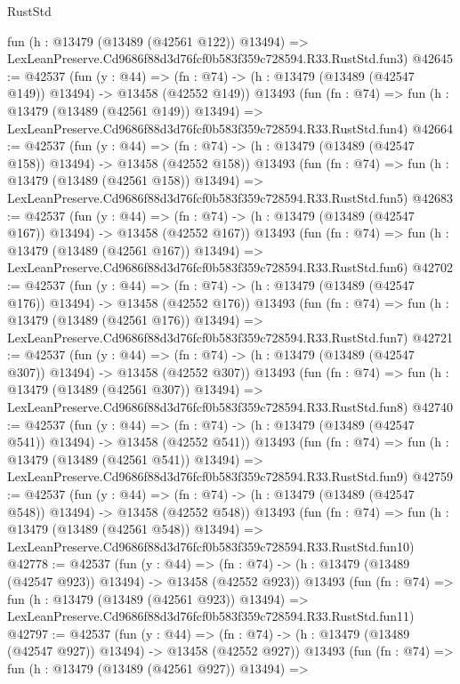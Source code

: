 \begin{lexlean}{RustStd}
\begin{coremodule}
    fun (h : @13479 (@13489 (@42561 @122)) @13494) =>
    LexLeanPreserve.Cd9686f88d3d76fcf0b583f359c728594.R33.RustStd.fun3)
@42645 := @42537
    (fun (y : @44) =>
    (fn : @74) -> (h : @13479 (@13489 (@42547 @149)) @13494) -> @13458 (@42552 @149))
    @13493
    (fun (fn : @74) =>
    fun (h : @13479 (@13489 (@42561 @149)) @13494) =>
    LexLeanPreserve.Cd9686f88d3d76fcf0b583f359c728594.R33.RustStd.fun4)
@42664 := @42537
    (fun (y : @44) =>
    (fn : @74) -> (h : @13479 (@13489 (@42547 @158)) @13494) -> @13458 (@42552 @158))
    @13493
    (fun (fn : @74) =>
    fun (h : @13479 (@13489 (@42561 @158)) @13494) =>
    LexLeanPreserve.Cd9686f88d3d76fcf0b583f359c728594.R33.RustStd.fun5)
@42683 := @42537
    (fun (y : @44) =>
    (fn : @74) -> (h : @13479 (@13489 (@42547 @167)) @13494) -> @13458 (@42552 @167))
    @13493
    (fun (fn : @74) =>
    fun (h : @13479 (@13489 (@42561 @167)) @13494) =>
    LexLeanPreserve.Cd9686f88d3d76fcf0b583f359c728594.R33.RustStd.fun6)
@42702 := @42537
    (fun (y : @44) =>
    (fn : @74) -> (h : @13479 (@13489 (@42547 @176)) @13494) -> @13458 (@42552 @176))
    @13493
    (fun (fn : @74) =>
    fun (h : @13479 (@13489 (@42561 @176)) @13494) =>
    LexLeanPreserve.Cd9686f88d3d76fcf0b583f359c728594.R33.RustStd.fun7)
@42721 := @42537
    (fun (y : @44) =>
    (fn : @74) -> (h : @13479 (@13489 (@42547 @307)) @13494) -> @13458 (@42552 @307))
    @13493
    (fun (fn : @74) =>
    fun (h : @13479 (@13489 (@42561 @307)) @13494) =>
    LexLeanPreserve.Cd9686f88d3d76fcf0b583f359c728594.R33.RustStd.fun8)
@42740 := @42537
    (fun (y : @44) =>
    (fn : @74) -> (h : @13479 (@13489 (@42547 @541)) @13494) -> @13458 (@42552 @541))
    @13493
    (fun (fn : @74) =>
    fun (h : @13479 (@13489 (@42561 @541)) @13494) =>
    LexLeanPreserve.Cd9686f88d3d76fcf0b583f359c728594.R33.RustStd.fun9)
@42759 := @42537
    (fun (y : @44) =>
    (fn : @74) -> (h : @13479 (@13489 (@42547 @548)) @13494) -> @13458 (@42552 @548))
    @13493
    (fun (fn : @74) =>
    fun (h : @13479 (@13489 (@42561 @548)) @13494) =>
    LexLeanPreserve.Cd9686f88d3d76fcf0b583f359c728594.R33.RustStd.fun10)
@42778 := @42537
    (fun (y : @44) =>
    (fn : @74) -> (h : @13479 (@13489 (@42547 @923)) @13494) -> @13458 (@42552 @923))
    @13493
    (fun (fn : @74) =>
    fun (h : @13479 (@13489 (@42561 @923)) @13494) =>
    LexLeanPreserve.Cd9686f88d3d76fcf0b583f359c728594.R33.RustStd.fun11)
@42797 := @42537
    (fun (y : @44) =>
    (fn : @74) -> (h : @13479 (@13489 (@42547 @927)) @13494) -> @13458 (@42552 @927))
    @13493
    (fun (fn : @74) =>
    fun (h : @13479 (@13489 (@42561 @927)) @13494) =>

\end{coremodule}
\end{lexlean}
